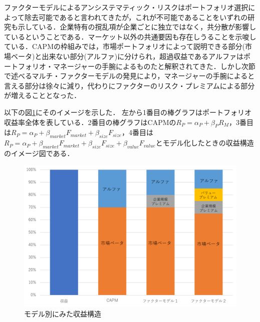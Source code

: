 ﻿\documentclass[a4paper]{jarticle}
\begin{document}
ファクターモデルによるアンシステマティック・リスクはポートフォリオ選択によって除去可能であると言われてきたが，これが不可能であることをいずれの研究も示している．企業特有の撹乱項が企業ごとに独立ではなく，共分散が影響しているということである．マーケット以外の共通要因も存在しうることを示唆している．CAPMの枠組みでは，市場ポートフォリオによって説明できる部分(市場ベータ)と出来ない部分(アルファ)に分けられ，超過収益であるアルファはポートフォリオ・マネージャーの手腕によるものたと解釈されてきた．しかし次節で述べるマルチ・ファクターモデルの発見により，マネージャーの手腕によると言える部分は徐々に減り，代わりにファクターのリスク・プレミアムによる部分が増えることとなった．

以下の図\ref{fig:beta}にそのイメージを示した．
左から1番目の棒グラフはポートフォリオ収益率全体を表している．2番目の棒グラフはCAPMの$R_P=\alpha_P + \beta_PR_M$，3番目は$R_P = \alpha_P + \beta_{market}F_{market} + \beta_{size}F_{size}$，4番目は$R_P = \alpha_P + \beta_{market}F_{market} + \beta_{size}F_{size} + \beta_{value}F_{value}$とモデル化したときの収益構造のイメージ図である．

\begin{figure}[H]
	\begin{center}
		\includegraphics[width=14cm]{./fig/beta}
		\caption{モデル別にみた収益構造}
		\label{fig:beta}
	\end{center}
\end{figure}
\end{document}
